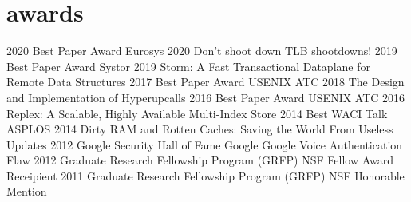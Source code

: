 \section{awards}

\begin{entrylist}
\entry
{2020}
{Best Paper Award}
{Eurosys 2020}
{Don’t shoot down TLB shootdowns!}
\entry
{2019}
{Best Paper Award}
{Systor 2019}
{Storm: A Fast Transactional Dataplane for Remote Data Structures}
\entry
{2017}
{Best Paper Award}
{USENIX ATC 2018}
{The Design and Implementation of Hyperupcalls}
\entry
{2016}
{Best Paper Award}
{USENIX ATC 2016}
{Replex: A Scalable, Highly Available Multi-Index Store}
\entry
{2014}
{Best WACI Talk}
{ASPLOS 2014}
{Dirty RAM and Rotten Caches: Saving the World From Useless Updates}
\entry
{2012}
{Google Security Hall of Fame}
{Google}
{Google Voice Authentication Flaw}
\entry
{2012}
{Graduate Research Fellowship Program (GRFP)}
{NSF}
{Fellow Award Receipient}
\entry
{2011}
{Graduate Research Fellowship Program (GRFP)}
{NSF}
{Honorable Mention}
\end{entrylist}
